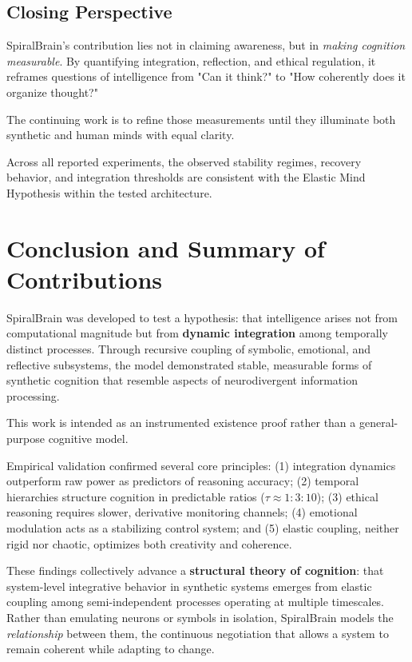 \documentclass[11pt,a4paper]{article}
\begin{document}
\subsection{Closing Perspective}

SpiralBrain's contribution lies not in claiming awareness, but in \textit{making cognition measurable}.
By quantifying integration, reflection, and ethical regulation, it reframes questions of intelligence from "Can it think?" to "How coherently does it organize thought?"

The continuing work is to refine those measurements until they illuminate both synthetic and human minds with equal clarity.

Across all reported experiments, the observed stability regimes, recovery behavior,
and integration thresholds are consistent with the Elastic Mind Hypothesis within
the tested architecture.

\section{Conclusion and Summary of Contributions}
\label{sec:conclusion}

SpiralBrain was developed to test a hypothesis: that intelligence arises not from computational magnitude but from \textbf{dynamic integration} among temporally distinct processes.
Through recursive coupling of symbolic, emotional, and reflective subsystems, the model demonstrated stable, measurable forms of synthetic cognition that resemble aspects of neurodivergent information processing.

This work is intended as an instrumented existence proof rather than a general-purpose cognitive model.

Empirical validation confirmed several core principles:
(1) integration dynamics outperform raw power as predictors of reasoning accuracy;
(2) temporal hierarchies structure cognition in predictable ratios ($\tau \approx 1 : 3 : 10$);
(3) ethical reasoning requires slower, derivative monitoring channels;
(4) emotional modulation acts as a stabilizing control system; and
(5) elastic coupling, neither rigid nor chaotic, optimizes both creativity and coherence.

These findings collectively advance a \textbf{structural theory of cognition}: that system-level integrative behavior in synthetic systems emerges from elastic coupling among semi-independent processes operating at multiple timescales.
Rather than emulating neurons or symbols in isolation, SpiralBrain models the \textit{relationship} between them, the continuous negotiation that allows a system to remain coherent while adapting to change.
\end{document}
